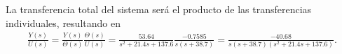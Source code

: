 La transferencia total del sistema será el producto de las transferencias individuales, resultando en
\begin{align*}
    \frac{Y(s)}{U(s)} = \frac{Y(s)}{\Theta(s)} \frac{\Theta(s)}{U(s)}
        = \frac{53.64}{s^2 + 21.4 s + 137.6} \frac{-0.7585}{s(s+38.7)}
        = \frac{-40.68}{s (s+38.7) (s^2 + 21.4 s + 137.6)}.
\end{align*}

